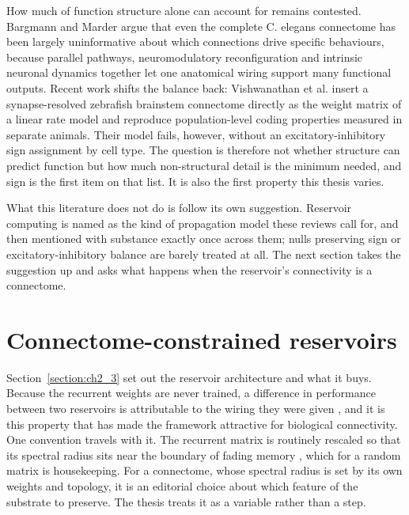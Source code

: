 How much of function structure alone can account for remains contested. Bargmann and
Marder \cite{bargmann2013connectome} argue that even the complete C. elegans connectome has
been largely uninformative about which connections drive specific behaviours, because
parallel pathways, neuromodulatory reconfiguration and intrinsic neuronal dynamics together
let one anatomical wiring support many functional outputs. Recent work shifts the balance
back: Vishwanathan et al. \cite{vishwanathan2024predicting} insert a synapse-resolved
zebrafish brainstem connectome directly as the weight matrix of a linear rate model and
reproduce population-level coding properties measured in separate animals. Their model
fails, however, without an excitatory-inhibitory sign assignment by cell type. The question
is therefore not whether structure can predict function but how much non-structural detail
is the minimum needed, and sign is the first item on that list. It is also the first
property this thesis varies.
 
What this literature does not do is follow its own suggestion. Reservoir computing is named
as the kind of propagation model these reviews call for, and then mentioned with substance
exactly once across them; nulls preserving sign or excitatory-inhibitory balance are barely
treated at all. The next section takes the suggestion up and asks what happens when the
reservoir's connectivity is a connectome.
 
 
 
 
\section{Connectome-constrained reservoirs}
\label{section:connectome-reservoirs}
\bigskip
 
Section~\ref{section:ch2_3} set out the reservoir architecture and what it buys. Because
the recurrent weights are never trained, a difference in performance between two reservoirs
is attributable to the wiring they were given \cite{jaeger2001echo, maass2002real,
yan2024emerging}, and it is this property that has made the framework attractive for
biological connectivity. One convention travels with it. The recurrent matrix is routinely
rescaled so that its spectral radius sits near the boundary of fading memory
\cite{tanaka2019recent, soussia2026reservoir}, which for a random matrix is housekeeping.
For a connectome, whose spectral radius is set by its own weights and topology, it is an
editorial choice about which feature of the substrate to preserve. The thesis treats it as
a variable rather than a step.
 

